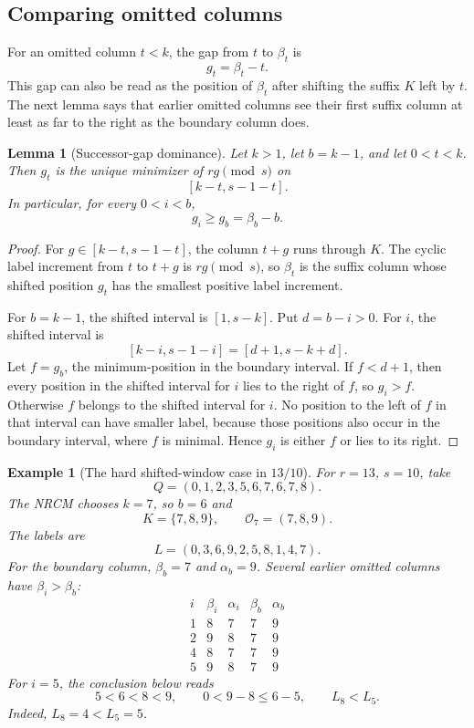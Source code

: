 \documentclass[10pt]{article}
\newtheorem{lemma}{Lemma}
\newtheorem{example}{Example}
\begin{document}
\subsection*{Comparing omitted columns}

For an omitted column \(t<k\), the gap from \(t\) to \(\beta_t\) is
\[
  g_t=\beta_t-t.
\]
This gap can also be read as the position of \(\beta_t\) after shifting the
suffix \(K\) left by \(t\).  The next lemma says that earlier omitted columns
see their first suffix column at least as far to the right as the boundary
column does.

\begin{lemma}[Successor-gap dominance]
Let \(k>1\), let \(b=k-1\), and let \(0<t<k\).  Then \(g_t\) is the unique
minimizer of \(rg\pmod s\) on
\[
  [k-t,s-1-t].
\]
In particular, for every \(0<i<b\),
\[
  g_i\ge g_b=\beta_b-b.
\]
\end{lemma}

\begin{proof}
For \(g\in[k-t,s-1-t]\), the column \(t+g\) runs through \(K\).  The cyclic
label increment from \(t\) to \(t+g\) is \(rg\pmod s\), so \(\beta_t\) is the
suffix column whose shifted position \(g_t\) has the smallest positive label
increment.

For \(b=k-1\), the shifted interval is \([1,s-k]\).  Put \(d=b-i>0\).  For
\(i\), the shifted interval is
\[
  [k-i,s-1-i]=[d+1,s-k+d].
\]
Let \(f=g_b\), the minimum-position in the boundary interval.  If \(f<d+1\),
then every position in the shifted interval for \(i\) lies to the right of
\(f\), so \(g_i>f\).  Otherwise \(f\) belongs to the shifted interval for
\(i\).  No position to the left of \(f\) in that interval can have smaller
label, because those positions also occur in the boundary interval, where
\(f\) is minimal.  Hence \(g_i\) is either \(f\) or lies to its right.
\end{proof}

\begin{example}[The hard shifted-window case in \(13/10\)]
For \(r=13\), \(s=10\), take
\[
  Q=(0,1,2,3,5,6,7,6,7,8).
\]
The NRCM chooses \(k=7\), so \(b=6\) and
\[
  K=\{7,8,9\},\qquad \mathcal O_7=(7,8,9).
\]
The labels are
\[
  L=(0,3,6,9,2,5,8,1,4,7).
\]
For the boundary column, \(\beta_b=7\) and \(\alpha_b=9\).  Several earlier
omitted columns have \(\beta_i>\beta_b\):
\[
\begin{array}{c|c|c|c|c}
i&\beta_i&\alpha_i&\beta_b&\alpha_b\\ \hline
1&8&7&7&9\\
2&9&8&7&9\\
4&8&7&7&9\\
5&9&8&7&9
\end{array}
\]
For \(i=5\), the conclusion below reads
\[
  5<6<8<9,\qquad 0<9-8\le6-5,\qquad L_8<L_5.
\]
Indeed, \(L_8=4<L_5=5\).
\end{example}
\end{document}
